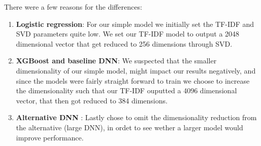 There were a few reasons for the differences:
\begin{enumerate}
  \item \textbf{Logistic regression}: For our simple model we initially set the TF-IDF and SVD parameters quite low. We
    set our TF-IDF model to output a 2048 dimensional vector that get reduced to 256 dimensions through SVD.

  \item \textbf{XGBoost and baseline DNN}: We suspected that the smaller dimensionality of our simple model, might
    impact our results negatively, and since the models were fairly straight forward to train we choose to increase the
    dimensionality such that our TF-IDF ouputted a 4096 dimensional vector, that then got reduced to 384 dimensions.

  \item \textbf{Alternative DNN} : Lastly chose to omit the dimensionality reduction from the alternative (large DNN),
    in ordet to see wether a larger model would improve performance.
\end{enumerate}
